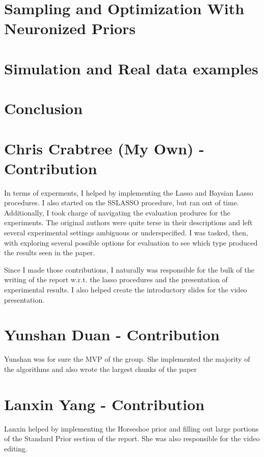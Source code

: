 \documentclass[11pt]{article}
\theoremstyle{definition}
\begin{document}


\section{Sampling and Optimization With Neuronized Priors}



\newpage
\section{Simulation and Real data examples}



\section{Conclusion}


%
\section{Chris Crabtree (My Own) - Contribution}
In terms of experments, I helped by implementing the Lasso and Baysian Lasso procedures. 
I also started on the SSLASSO procedure, but ran out of time. 
Additionally, I took charge of  navigating the evaluation produres for the experiments.
The original authors were quite terse in their descriptions and left several experimental settings ambiguous or underspecified.
I was tasked, then, with exploring several possible options for evaluation to see which type produced the results seen in the paper.

Since I made those contributions, I naturally was responsible for the bulk of the writing of the report w.r.t. the lasso procedures and the presentation of experimental results.
I also helped create the introductory slides for the video presentation.
\section{Yunshan Duan - Contribution}
Yunshan was for sure the MVP of the group. 
She implemented the majority of the algorithms and also wrote the largest chunks of the paper

\section{Lanxin Yang - Contribution}
Lanxin helped by implementing the Horseshoe prior and filling out large portions of the Standard Prior section of the report.
She was also responsible for the video editing.
\newpage


\end{document}
